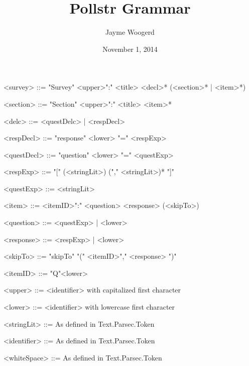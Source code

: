\documentclass{article}
\title{Pollstr Grammar}
\author{Jayme Woogerd}
\date{November 1, 2014}
\begin{document}
\maketitle
\thispagestyle{empty}

\begin{grammar}

    <survey>     ::= "Survey"  <upper>":" <title> <decl>* (<section>* | <item>*)

    <section>    ::= "Section" <upper>":" <title> <item>* 

    <delc>       ::= <questDelc> | <respDecl>

    <respDecl>   ::= "response" <lower> "=" <respExp>

    <questDecl>  ::= "question" <lower> "=" <questExp>

    <respExp>    ::= "[" (<stringLit>) ("," <stringLit>)* "]"

    <questExp>   ::= <stringLit>

    <item>       ::= <itemID>":" <question> <response> (<skipTo>)

    <question>   ::= <questExp> | <lower>

    <response>   ::= <respExp> | <lower>

    <skipTo>     ::= "skipTo" "(" <itemID>"," <response> ")"

    <itemID>     ::= "Q"<lower>

    <upper> ::= <identifier> with capitalized first character
    
    <lower>      ::= <identifier> with lowercase first character

    <stringLit>  ::= As defined in Text.Parsec.Token

    <identifier> ::= As defined in Text.Parsec.Token

    <whiteSpace> ::= As defined in Text.Parsec.Token


\end{grammar}
\end{document}
